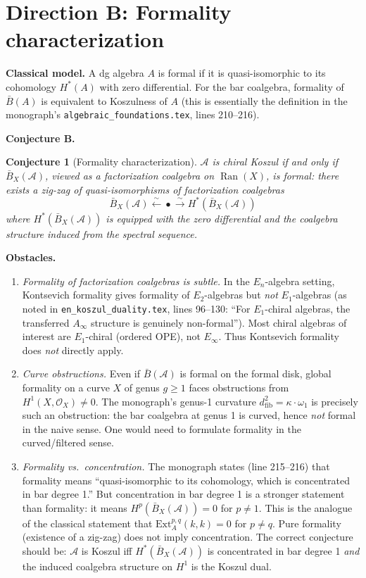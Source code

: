 \documentclass[11pt]{article}
\newtheorem{conjecture}{Conjecture}
\theoremstyle{remark}
\newcommand{\cA}{\mathcal{A}}
\newcommand{\barB}{\bar{B}}
\newcommand{\Ext}{\mathrm{Ext}}
\newcommand{\Ran}{\operatorname{Ran}}
\begin{document}
\section{Direction B: Formality characterization}

\textbf{Classical model.}  A dg algebra $A$ is formal if it is quasi-isomorphic to its cohomology $H^*(A)$ with zero differential.  For the bar coalgebra, formality of $\barB(A)$ is equivalent to Koszulness of $A$ (this is essentially the definition in the monograph's \texttt{algebraic\_foundations.tex}, lines 210--216).

\textbf{Conjecture B.}
\begin{conjecture}[Formality characterization]\label{conj:formality}
$\cA$ is chiral Koszul if and only if $\barB_X(\cA)$, viewed as a factorization coalgebra on $\Ran(X)$, is formal: there exists a zig-zag of quasi-isomorphisms of factorization coalgebras
\[
\barB_X(\cA) \xleftarrow{\sim} \bullet \xrightarrow{\sim} H^*(\barB_X(\cA))
\]
where $H^*(\barB_X(\cA))$ is equipped with the zero differential and the coalgebra structure induced from the spectral sequence.
\end{conjecture}

\textbf{Obstacles.}
\begin{enumerate}[label=(B\arabic*)]
\item \emph{Formality of factorization coalgebras is subtle.}  In the $E_n$-algebra setting, Kontsevich formality gives formality of $E_2$-algebras but \emph{not} $E_1$-algebras (as noted in \texttt{en\_koszul\_duality.tex}, lines 96--130: ``For $E_1$-chiral algebras, the transferred $A_\infty$ structure is genuinely non-formal'').  Most chiral algebras of interest are $E_1$-chiral (ordered OPE), not $E_\infty$.  Thus Kontsevich formality does \emph{not} directly apply.

\item \emph{Curve obstructions.}  Even if $\barB(\cA)$ is formal on the formal disk, global formality on a curve $X$ of genus $g \geq 1$ faces obstructions from $H^1(X, \mathcal{O}_X) \neq 0$.  The monograph's genus-1 curvature $d_{\mathrm{fib}}^2 = \kappa \cdot \omega_1$ is precisely such an obstruction: the bar coalgebra at genus 1 is curved, hence \emph{not} formal in the naive sense.  One would need to formulate formality in the curved/filtered sense.

\item \emph{Formality vs.\ concentration.}  The monograph states (line 215--216) that formality means ``quasi-isomorphic to its cohomology, which is concentrated in bar degree 1.''  But concentration in bar degree 1 is a stronger statement than formality: it means $H^p(\barB_X(\cA)) = 0$ for $p \neq 1$.  This is the analogue of the classical statement that $\Ext^{p,q}_A(k,k) = 0$ for $p \neq q$.  Pure formality (existence of a zig-zag) does not imply concentration.  The correct conjecture should be: $\cA$ is Koszul iff $H^*(\barB_X(\cA))$ is concentrated in bar degree 1 \emph{and} the induced coalgebra structure on $H^1$ is the Koszul dual.
\end{enumerate}
\end{document}
